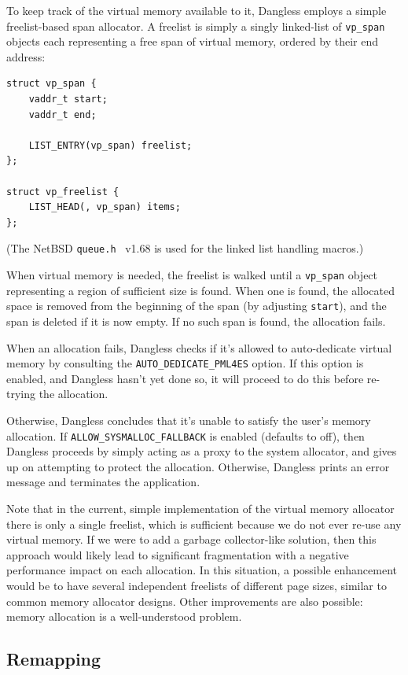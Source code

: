 To keep track of the virtual memory available to it, Dangless employs a simple freelist-based span allocator. A freelist is simply a singly linked-list of \lstinline!vp_span! objects each representing a free span of virtual memory, ordered by their end address:

\begin{lstlisting}
struct vp_span {
	vaddr_t start;
	vaddr_t end;
	
	LIST_ENTRY(vp_span) freelist;
};

struct vp_freelist {
	LIST_HEAD(, vp_span) items;
};
\end{lstlisting}

(The NetBSD \texttt{queue.h}~\cite{netbsd-queue-ref} v1.68 is used for the linked list handling macros.)

When virtual memory is needed, the freelist is walked until a \lstinline!vp_span! object representing a region of sufficient size is found. When one is found, the allocated space is removed from the beginning of the span (by adjusting \lstinline!start!), and the span is deleted if it is now empty. If no such span is found, the allocation fails.

When an allocation fails, Dangless checks if it's allowed to auto-dedicate virtual memory by consulting the \lstinline!AUTO_DEDICATE_PML4ES! option. If this option is enabled, and Dangless hasn't yet done so, it will proceed to do this before re-trying the allocation.

Otherwise, Dangless concludes that it's unable to satisfy the user's memory allocation. If \lstinline!ALLOW_SYSMALLOC_FALLBACK! is enabled (defaults to off), then Dangless proceeds by simply acting as a proxy to the system allocator, and gives up on attempting to protect the allocation. Otherwise, Dangless prints an error message and terminates the application.

Note that in the current, simple implementation of the virtual memory allocator there is only a single freelist, which is sufficient because we do not ever re-use any virtual memory. If we were to add a garbage collector-like solution, then this approach would likely lead to significant fragmentation with a negative performance impact on each allocation. In this situation, a possible enhancement would be to have several independent freelists of different page sizes, similar to common memory allocator designs. Other improvements are also possible: memory allocation is a well-understood problem.

\subsection{Remapping}

